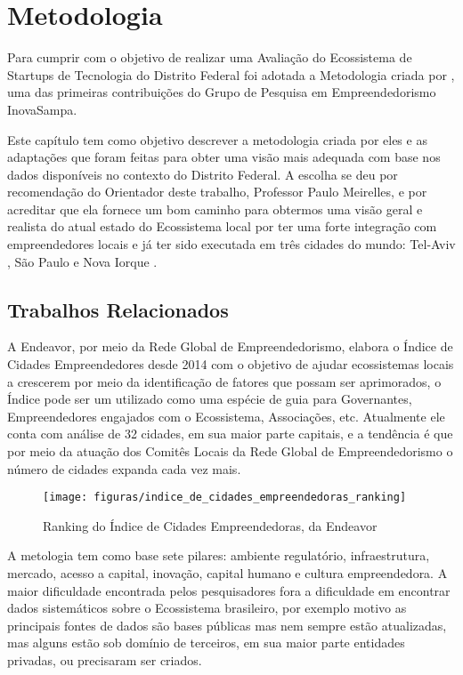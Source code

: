\chapter[Metodologia]{Metodologia}
\label{cap-metodologia}

Para cumprir com o objetivo de realizar uma Avaliação do Ecossistema de Startups de Tecnologia do Distrito Federal foi adotada a Metodologia criada por , uma das primeiras contribuições do Grupo de Pesquisa em Empreendedorismo InovaSampa. 

Este capítulo tem como objetivo descrever a metodologia criada por eles e as adaptações que foram feitas para obter uma visão mais adequada com base nos dados disponíveis no contexto do Distrito Federal. A escolha se deu por recomendação do Orientador deste trabalho, Professor Paulo Meirelles, e por acreditar que ela fornece um bom caminho para obtermos uma visão geral e realista do atual estado do Ecossistema local por ter uma forte integração com empreendedores locais e já ter sido executada em três cidades do mundo: Tel-Aviv , São Paulo  e Nova Iorque . 

\section{Trabalhos Relacionados}
\label{section:trabalhos_relacionados}

A Endeavor, por meio da Rede Global de Empreendedorismo, elabora o Índice de Cidades Empreendedores desde 2014 com o objetivo de ajudar ecossistemas locais a crescerem por meio da identificação de fatores que possam ser aprimorados, o Índice pode ser um utilizado como uma espécie de guia para Governantes, Empreendedores engajados com o Ecossistema, Associações, etc. Atualmente ele conta com análise de 32 cidades, em sua maior parte capitais, e a tendência é que por meio da atuação dos Comitês Locais da Rede Global de Empreendedorismo o número de cidades expanda cada vez mais.

\begin{figure}[!htb]
\centering
\texttt{[image: figuras/indice\_de\_cidades\_empreendedoras\_ranking]}
\caption{Ranking do Índice de Cidades Empreendedoras, da Endeavor}
\label{Rotulo}
\end{figure}

A metologia tem como base sete pilares: ambiente regulatório, infraestrutura, mercado, acesso a capital, inovação, capital humano e cultura empreendedora. A maior dificuldade encontrada pelos pesquisadores fora a dificuldade em encontrar dados sistemáticos sobre o Ecossistema brasileiro, por exemplo motivo as principais fontes de dados são bases públicas mas nem sempre estão atualizadas, mas alguns estão sob domínio de terceiros, em sua maior parte entidades privadas, ou precisaram ser criados. 

